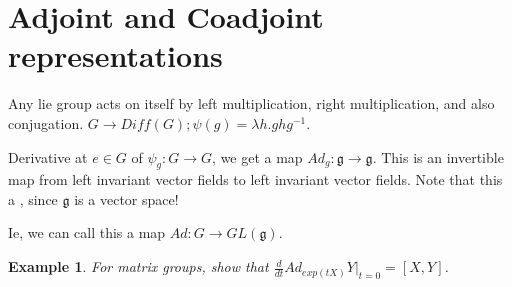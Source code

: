 \documentclass[11pt]{book}
\newtheorem{example}[theorem]{Example}
\begin{document}
\section{Adjoint and Coadjoint representations}

Any lie group acts on itself by left multiplication, right multiplication, and
also conjugation. $G \rightarrow Diff(G); \psi(g) = \lambda h. ghg^{-1}$.


Derivative at $e \in G$ of $\psi_g: G \rightarrow G$, we get a map
$Ad_g: \mathfrak g \rightarrow \mathfrak g$. This is an invertible map
from left invariant vector fields to left invariant vector fields. Note that
this a , since $\mathfrak g$ is
a vector space!


Ie, we can call this a map $Ad: G \rightarrow GL(\mathfrak g)$.


\begin{example}
For matrix groups, show that $\frac{d}{dt} A d_{exp(tX)} Y |_{t = 0} = [X, Y]$.
\end{example}
\end{document}
